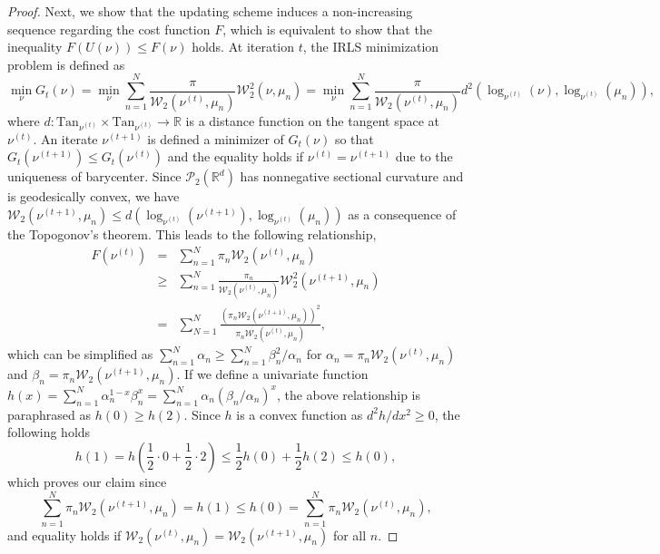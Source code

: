 \documentclass[11pt]{article}
\newcommand{\calP}{\mathcal{P}}
\newcommand{\calW}{\mathcal{W}}
\newcommand{\bbR}{\mathbb{R}}
\begin{document}
\begin{proof}
	Next, we show that the updating scheme induces a non-increasing sequence regarding the cost function $F$, which is equivalent to show that the inequality $F(U(\nu)) \leq F(\nu)$ holds. At iteration $t$, the IRLS minimization problem is defined as 
	\begin{equation*}
	\min_\nu G_t (\nu) = \min_\nu \sum_{n=1}^N \frac{\pi}{\calW_2 (\nu^{(t)}, \mu_n)} \calW_2^2 (\nu, \mu_n) = \min_\nu \sum_{n=1}^N \frac{\pi}{\calW_2 (\nu^{(t)}, \mu_n)} d^2 (\log_{\nu^{(t)}} (\nu), \log_{\nu^{(t)}} (\mu_n)),
	\end{equation*}
	where $d : \text{Tan}_{\nu^{(t)}} \times \text{Tan}_{\nu^{(t)}} \rightarrow \bbR$ is a distance function on the tangent space at $\nu^{(t)}$. An iterate $\nu^{(t+1)}$ is defined a minimizer of $G_t (\nu)$ so that $G_t (\nu^{(t+1)}) \leq G_t (\nu^{(t)})$ and the equality holds if $\nu^{(t)} = \nu^{(t+1)}$ due to the uniqueness of barycenter. Since $\calP_2(\bbR^d)$ has nonnegative sectional curvature and is geodesically convex, we have $	\calW_2 (\nu^{(t+1)}, \mu_n) \leq d ( \log_{\nu^{(t)}} (\nu^{(t+1)}), \log_{\nu^{(t)}} (\mu_n))$ as a consequence of the Topogonov's theorem. This leads to the following relationship, 
	\begin{eqnarray*}
		F (\nu^{(t)})  &=& \sum_{n=1}^N \pi_n \calW_2 (\nu^{(t)}, \mu_n) \\
		&\geq& \sum_{n=1}^N \frac{\pi_n}{\calW_2 (\nu^{(t)}, \mu_n)} \calW_2^2 (\nu^{(t+1)}, \mu_n)\\
		&=& \sum_{N=1}^N \frac{\left(\pi_n\calW_2 (\nu^{(t+1)}, \mu_n)\right)^2 }{\pi_n \calW_2 (\nu^{(t)}, \mu_n)},
	\end{eqnarray*}
	which can be simplified as $\sum_{n=1}^N \alpha_n \geq \sum_{n=1}^N \beta_n^2 / \alpha_n$ for $\alpha_n = \pi_n \calW_2 (\nu^{(t)}, \mu_n)$ and $\beta_n = \pi_n \calW_2 (\nu^{(t+1)}, \mu_n)$. If we define a univariate function $h(x) = \sum_{n=1}^N \alpha_n^{1-x} \beta_n^x = \sum_{n=1}^N \alpha_n (\beta_n / \alpha_n)^x$, the above relationship is paraphrased as $h(0) \geq h(2)$. Since $h$ is a convex function as $d^2 h / dx^2 \geq 0$, the following holds
	\begin{equation*}
	h(1) = h\left(\frac{1}{2}\cdot 0 + \frac{1}{2}\cdot 2\right) \leq \frac{1}{2} h(0) + \frac{1}{2} h(2) \leq h(0),
	\end{equation*}
	which proves our claim since
	\begin{equation*}
	\sum_{n=1}^N \pi_n \calW_2 (\nu^{(t+1)}, \mu_n) = h(1) \leq h(0) = \sum_{n=1}^N \pi_n \calW_2(\nu^{(t)}, \mu_n),
	\end{equation*}
	and equality holds if $\calW_2(\nu^{(t)}, \mu_n) = \calW_2(\nu^{(t+1)}, \mu_n)$ for all $n$. 
	

\end{proof}
\end{document}
